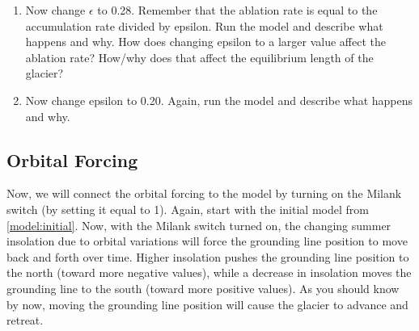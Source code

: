 \documentclass[11pt,letterpaper]{article}
\begin{document}
\begin{enumerate}[label=(\alph*)]
\item Now change $\epsilon$ to 0.28. Remember that the ablation rate is equal to the accumulation rate divided by epsilon. Run the model and describe what happens and why. How does changing epsilon to a larger value affect the ablation rate? How/why does that affect the equilibrium length of the glacier?

\item Now change epsilon to 0.20. Again, run the model and describe what happens and why.
\end{enumerate}


%
% 
%
%
%
%


\subsection{Orbital Forcing}
Now, we will connect the orbital forcing to the model by turning on the Milank switch (by setting it equal to 1). Again, start with the initial model from \ref{model:initial}. Now, with the Milank switch turned on, the changing summer insolation due to orbital variations will force the grounding line position to move back and forth over time. Higher insolation pushes the grounding line position to the north (toward more negative values), while a decrease in insolation moves the grounding line to the south (toward more positive values). As you should know by now, moving the grounding line position will cause the glacier to advance and retreat.
\end{document}

